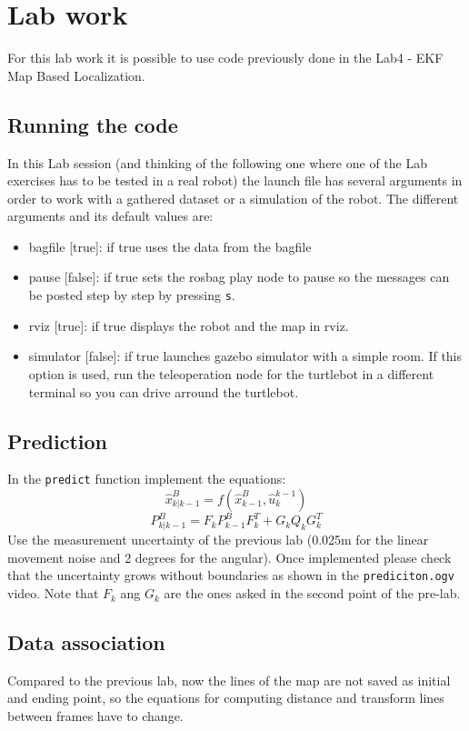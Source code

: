\documentclass[a4paper,10pt]{article}
\begin{document}
\section{Lab work}
For this lab work it is possible to use code previously done in the Lab4 - EKF Map Based Localization.


\subsection{Running the code}
In this Lab session (and thinking of the following one where one of the Lab exercises has to be tested in a real robot) the launch file has several arguments in order to work with a gathered dataset or a simulation of the robot. The different arguments and its default values are:
\begin{itemize}
	\item bagfile [true]: if true uses the data from the bagfile
	\item pause [false]: if true sets the rosbag play node to pause so the messages can be posted step by step by pressing \texttt{s}.
	\item rviz [true]: if true displays the robot and the map in rviz.
	\item simulator [false]: if true launches gazebo simulator with a simple room. If this option is used, run the teleoperation node for the turtlebot in a different terminal so you can drive arround the turtlebot.
\end{itemize} 

\subsection{Prediction}
In the \texttt{predict} function implement the equations:
\begin{equation}
	\widehat{x}_{k|k-1}^B = f\left(\widehat{x}_{k-1}^B,\widehat{u}_k^{k-1} \right)
\end{equation}
\begin{equation}
	P_{k|k-1}^B = F_k P_{k-1}^B F_k^T + G_k Q_k G_k^T
\end{equation}
Use the measurement uncertainty of the previous lab (0.025m for the linear movement noise and 2 degrees for the angular). Once implemented please check that the uncertainty grows without boundaries as shown in the \texttt{prediciton.ogv} video. Note that $F_k$ ang $G_k$ are the ones asked in the second point of the pre-lab.

\subsection{Data association}
Compared to the previous lab, now the lines of the map are not saved as initial and ending point, so the equations for computing distance and transform lines between frames have to change.
\end{document}

